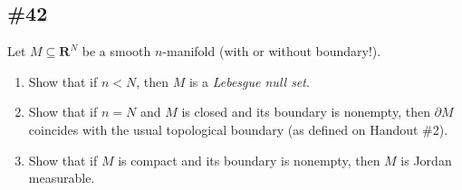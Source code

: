 \documentclass{article}
\newcommand{\R}{\mathbf{R}}
\theoremstyle{plain} %
\numberwithin{thm}{section} %
\theoremstyle{definition}
\begin{document}
        \subsection{\#42}
        Let $M\subseteq \R^N$ be a smooth $n$-manifold (with or without boundary!).
        \begin{enumerate}[label=(\alph*)]
            \item Show that if $n<N$, then $M$ is a \textit{Lebesgue null set}.

            \item Show that if $n=N$ and $M$ is closed and its boundary is nonempty, then $\partial M$ coincides with the usual topological boundary (as defined on Handout \#2).

            \item Show that if $M$ is compact and its boundary is nonempty, then $M$ is Jordan measurable.
        \end{enumerate}
\end{document}
